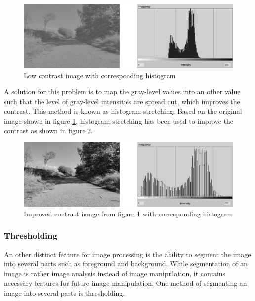 \begin{figure}[H]
	\centering
	\includegraphics[width=1\textwidth]{8Misc/Pictures/Introduction/img_lc_full.jpg}
	\caption{Low contrast image with corresponding histogram}
	\label{fig:HistogramLowContrast}
\end{figure}

A solution for this problem is to map the gray-level values into an other value such that the level of gray-level intensities are spread out, which improves the contrast. This method is known as histogram stretching. Based on the original image shown in figure \ref{fig:HistogramLowContrast}, histogram stretching has been used to improve the contrast as shown in figure \ref{fig:HistogramImprovedContrast}.

\begin{figure}[H]
	\centering
	\includegraphics[width=1\textwidth]{8Misc/Pictures/Introduction/img_hc_full.jpg}
	\caption{Improved contrast image from figure \ref{fig:HistogramLowContrast} with corresponding histogram}
	\label{fig:HistogramImprovedContrast}
\end{figure}

\subsubsection*{Thresholding}
An other distinct feature for image processing is the ability to segment the image into several parts such as foreground and background. While segmentation of an image is rather image analysis instead of image manipulation, it contains necessary features for future image manipulation. One method of segmenting an image into several parts is thresholding.

